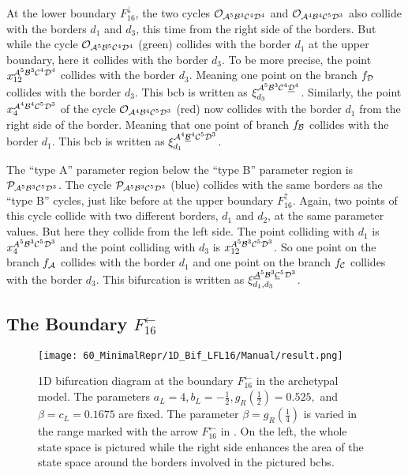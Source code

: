 At the lower boundary $F_{16}^\downarrow$, the two cycles $\mathcal{O}_{\mathcal{A}^5\mathcal{B}^3\mathcal{C}^4\mathcal{D}^4}$ and $\mathcal{O}_{\mathcal{A}^4\mathcal{B}^4\mathcal{C}^5\mathcal{D}^3}$ also collide with the borders $d_1$ and $d_3$, this time from the right side of the borders.
But while the cycle $\mathcal{O}_{\mathcal{A}^5\mathcal{B}^5\mathcal{C}^4\mathcal{D}^4}$ (green) collides with the border $d_1$ at the upper boundary, here it collides with the border $d_3$.
To be more precise, the point $x_{12}^{\mathcal{A}^5\mathcal{B}^3\mathcal{C}^4\mathcal{D}^4}$ collides with the border $d_3$.
Meaning one point on the branch $f_{\mathcal{D}}$ collides with the border $d_3$.
This \gls{bcb} is written as $\xi_{d_3}^{\mathcal{A}^5\mathcal{B}^3\mathcal{C}^4\underline{\mathcal{D}}^4}$.
Similarly, the point $x_{4}^{\mathcal{A}^4\mathcal{B}^4\mathcal{C}^5\mathcal{D}^3}$ of the cycle $\mathcal{O}_{\mathcal{A}^4\mathcal{B}^4\mathcal{C}^5\mathcal{D}^3}$ (red) now collides with the border $d_1$ from the right side of the border.
Meaning that one point of branch $f_{\mathcal{B}}$ collides with the border $d_1$.
This \gls{bcb} is written as $\xi_{d_1}^{\mathcal{A}^4\underline{\mathcal{B}}^4\mathcal{C}^5\mathcal{D}^3}$.

The ``type A'' parameter region below the ``type B'' parameter region is $\mathcal{P}_{\mathcal{A}^5\mathcal{B}^3\mathcal{C}^5\mathcal{D}^3}$.
The cycle $\mathcal{P}_{\mathcal{A}^5\mathcal{B}^3\mathcal{C}^5\mathcal{D}^3}$ (blue) collides with the same borders as the ``type B'' cycles, just like before at the upper boundary $F_{16}^\uparrow$.
Again, two points of this cycle collide with two different borders, $d_1$ and $d_2$, at the same parameter values.
But here they collide from the left side.
The point colliding with $d_1$ is $x_{4}^{A^5\mathcal{B}^3\mathcal{C}^5\mathcal{D}^3}$ and the point colliding with $d_3$ is $x_{12}^{A^5\mathcal{B}^3\mathcal{C}^5\mathcal{D}^3}$.
So one point on the branch $f_{\mathcal{A}}$ collides with the border $d_1$ and one point on the branch $f_{\mathcal{C}}$ collides with the border $d_3$.
This bifurcation is written as $\xi_{d_1, d_3}^{\underline{\mathcal{A}}^5\mathcal{B}^3\underline{\mathcal{C}}^5\mathcal{D}^3}$.

\subsection{The Boundary $F_{16}^\leftarrow$}
\label{sec:arch.bif.L}

\begin{figure}
	\centering
	\texttt{[image: 60\_MinimalRepr/1D\_Bif\_LFL16/Manual/result.png]}
	\caption[1D bifurcation diagram at the boundary $F_{16}^\leftarrow$ in the archetypal model]{
		1D bifurcation diagram at the boundary $F_{16}^\leftarrow$ in the archetypal model.
		The parameters $a_L = 4, b_L = -\frac{1}{2}, g_R\left(\frac{1}{2}\right) = 0.525,$ and $\beta = c_L = 0.1675$ are fixed.
		The parameter $\beta = g_R\left(\frac{1}{4}\right)$ is varied in the range marked with the arrow $F_{16}^\leftarrow$ in .
		On the left, the whole state space is pictured while the right side enhances the area of the state space around the borders involved in the pictured \glspl{bcb}.
	}
	\label{fig:arch.bif.F.left}
\end{figure}

